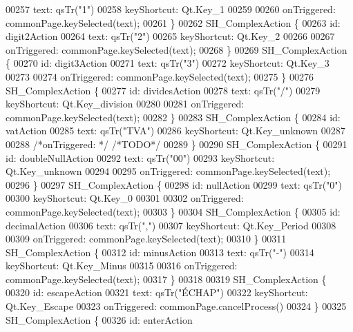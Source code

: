 \begin{DoxyCode}
00257         text: qsTr(\textcolor{stringliteral}{"1"})
00258         keyShortcut: Qt.Key\_1
00259 
00260         onTriggered: commonPage.keySelected(text);
00261     \}
00262     SH\_ComplexAction \{
00263         \textcolor{keywordtype}{id}: digit2Action
00264         text: qsTr(\textcolor{stringliteral}{"2"})
00265         keyShortcut: Qt.Key\_2
00266 
00267         onTriggered: commonPage.keySelected(text);
00268     \}
00269     SH\_ComplexAction \{
00270         \textcolor{keywordtype}{id}: digit3Action
00271         text: qsTr(\textcolor{stringliteral}{"3"})
00272         keyShortcut: Qt.Key\_3
00273 
00274         onTriggered: commonPage.keySelected(text);
00275     \}
00276     SH\_ComplexAction \{
00277         \textcolor{keywordtype}{id}: dividesAction
00278         text: qsTr(\textcolor{stringliteral}{"/"})
00279         keyShortcut: Qt.Key\_division
00280 
00281         onTriggered: commonPage.keySelected(text);
00282     \}
00283     SH\_ComplexAction \{
00284         \textcolor{keywordtype}{id}: vatAction
00285         text: qsTr(\textcolor{stringliteral}{"TVA"})
00286         keyShortcut: Qt.Key\_unknown
00287 
00288         \textcolor{comment}{/*onTriggered: */} \textcolor{comment}{/*TODO*/}
00289     \}
00290     SH\_ComplexAction \{
00291         \textcolor{keywordtype}{id}: doubleNullAction
00292         text: qsTr(\textcolor{stringliteral}{"00"})
00293         keyShortcut: Qt.Key\_unknown
00294 
00295         onTriggered: commonPage.keySelected(text);
00296     \}
00297     SH\_ComplexAction \{
00298         \textcolor{keywordtype}{id}: nullAction
00299         text: qsTr(\textcolor{stringliteral}{"0"})
00300         keyShortcut: Qt.Key\_0
00301 
00302         onTriggered: commonPage.keySelected(text);
00303     \}
00304     SH\_ComplexAction \{
00305         \textcolor{keywordtype}{id}: decimalAction
00306         text: qsTr(\textcolor{stringliteral}{","})
00307         keyShortcut: Qt.Key\_Period
00308 
00309         onTriggered: commonPage.keySelected(text);
00310     \}
00311     SH\_ComplexAction \{
00312         \textcolor{keywordtype}{id}: minusAction
00313         text: qsTr(\textcolor{stringliteral}{"-"})
00314         keyShortcut: Qt.Key\_Minus
00315 
00316         onTriggered: commonPage.keySelected(text);
00317     \}
00318 
00319     SH\_ComplexAction \{
00320         \textcolor{keywordtype}{id}: escapeAction
00321         text: qsTr(\textcolor{stringliteral}{"ÉCHAP"})
00322         keyShortcut: Qt.Key\_Escape
00323         onTriggered: commonPage.cancelProcess()
00324     \}
00325     SH\_ComplexAction \{
00326         \textcolor{keywordtype}{id}: enterAction

\end{DoxyCode}
